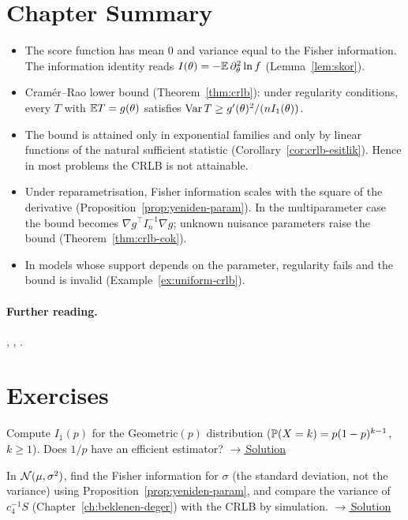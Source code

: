 \documentclass[main.tex]{subfiles}
\begin{document}
\section{Chapter Summary}
\begin{summary}
\begin{itemize}
  \item The score function has mean $0$ and variance equal to the Fisher information. The information identity reads $I(\theta)=-\E\,\partial^2_\theta\ln f$ (Lemma~\ref{lem:skor}).
  \item Cramér--Rao lower bound (Theorem~\ref{thm:crlb}): under regularity conditions, every $T$ with $\E T=g(\theta)$ satisfies $\Var T\ge g'(\theta)^2/(nI_1(\theta))$.
  \item The bound is attained only in exponential families and only by linear functions of the natural sufficient statistic (Corollary~\ref{cor:crlb-esitlik}). Hence in most problems the CRLB is not attainable.
  \item Under reparametrisation, Fisher information scales with the square of the derivative (Proposition~\ref{prop:yeniden-param}). In the multiparameter case the bound becomes $\nabla g^\top I_n^{-1}\nabla g$; unknown nuisance parameters raise the bound (Theorem~\ref{thm:crlb-cok}).
  \item In models whose support depends on the parameter, regularity fails and the bound is invalid (Example~\ref{ex:uniform-crlb}).
\end{itemize}
\end{summary}

\paragraph{Further reading.} \cite[Section~7.3]{casella}, \cite[Section~2.5]{lehmann-casella}, \cite[Chapter~3]{shao}.

\section{Exercises}

\begin{exercise}\label{exr:08-1}
Compute $I_1(p)$ for the $\text{Geometric}(p)$ distribution ($\P(X=k)=p(1-p)^{k-1}$, $k\ge1$). Does $1/p$ have an efficient estimator?
\hfill\hyperref[coz:08-1]{\footnotesize$\rightarrow$\,Solution}
\end{exercise}

\begin{exercise}\label{exr:08-2}
In $\Normal(\mu,\sigma^2)$, find the Fisher information for $\sigma$ (the standard deviation, not the variance) using Proposition~\ref{prop:yeniden-param}, and compare the variance of $c_4^{-1}S$ (Chapter~\ref{ch:beklenen-deger}) with the CRLB by simulation.
\hfill\hyperref[coz:08-2]{\footnotesize$\rightarrow$\,Solution}
\end{exercise}
\end{document}
